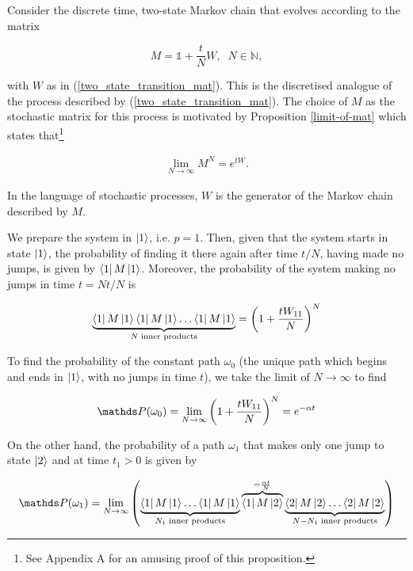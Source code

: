 Consider the discrete time, two-state Markov chain that evolves according to the matrix

\begin{equation}
M = \mathds{1} + \frac{t}{N}W, \; \; N \in \mathds{N},
\end{equation}

with $W$ as in (\ref{two_state_transition_mat}). This is the discretised analogue of the process described by (\ref{two_state_transition_mat}). The choice of $M$ as the stochastic matrix for this process is motivated by Proposition \ref{limit-of-mat} which states that\footnote{See Appendix A for an amusing proof of this proposition.}

\begin{align}
\lim_{N\rightarrow \infty}M^N = e^{tW}.
\end{align}

In the language of stochastic processes, $W$ is the generator of the Markov chain described by $M$. 

We prepare the system in $\ket{1}$, i.e. $p=1$. Then, given that the system starts in state $\ket{1} $, the probability of finding it there again after time $t/N$, having made no jumps, is given by $\bra{1} M\ket{1}  $. Moreover, the probability of the system making no jumps in time $t = Nt/N$ is

\begin{equation}
  \underbrace{\bra{1} M\ket{1}  \bra{1} M\ket{1}  \ldots \bra{1} M\ket{1}  }_{N \; \text{inner products}} = \left(1+\frac{tW_{11}}{N}\right)^N
\end{equation}

To find the probability of the constant path $\omega_0$ (the unique path which begins and ends in $\ket{1}  $, with no jumps in time $t$), we take the limit of $N \rightarrow \infty$ to find

\begin{equation}
  \bP(\omega_0) = \lim_{N \rightarrow \infty} \left(1+\frac{tW_{11}}{N}\right)^N = e^{-\alpha t}
\end{equation}

On the other hand, the probability of a path $\omega_1$ that makes only one jump to state $\ket{2}  $ and at time $t_1 > 0$ is given by

\begin{equation}\label{omega1_prob}
  \bP(\omega_1) = \lim_{N \rightarrow \infty}\left ( \underbrace{\bra{1} M\ket{1}  \ldots \bra{1} M\ket{1}  }_{N_1 \; \text{inner products}} \overbrace{\bra{1} M \ket{2}  }^{ = \frac{\alpha t}{N}} \underbrace {\bra{2} M\ket{2}  \ldots \bra{2} M\ket{2}  }_{N - N_1 \; \text{inner products}}\right)
\end{equation}

